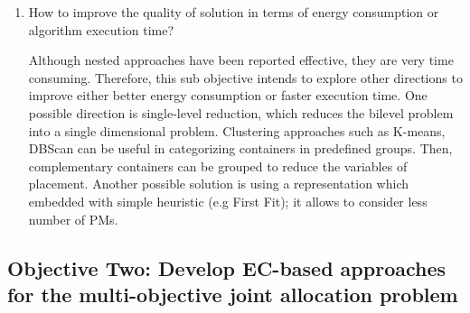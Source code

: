 \begin{enumerate}
	\item How to improve the quality of solution in terms of energy consumption or algorithm execution time?

	Although nested approaches have been reported effective, they are very time consuming. Therefore, this sub objective intends to explore other directions to improve either better energy consumption or faster execution time. One possible direction is single-level reduction, which reduces the bilevel problem into a single dimensional problem. Clustering approaches such as K-means, DBScan can be useful in categorizing containers in predefined groups. Then, complementary containers can be grouped to reduce the variables of placement. Another possible solution is using a representation which embedded with simple heuristic (e.g First Fit); it allows to consider less number of PMs.  

\end{enumerate}
\subsection{Objective Two: Develop EC-based approaches for the multi-objective joint allocation problem}

